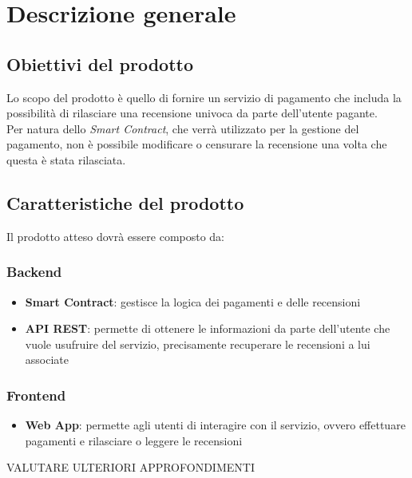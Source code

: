 \section{Descrizione generale}
    \subsection{Obiettivi del prodotto}
    Lo scopo del prodotto è quello di fornire un servizio di pagamento che includa la possibilità di rilasciare una recensione univoca da parte dell'utente pagante. \\
    Per natura dello \textit{Smart Contract}, che verrà utilizzato per la gestione del pagamento, non è possibile modificare o censurare la recensione una volta che questa è stata rilasciata. 

    \subsection{Caratteristiche del prodotto}
    Il prodotto atteso dovrà essere composto da:

        \subsubsection{Backend}
        \begin{itemize}
            \item \textbf{Smart Contract}: gestisce la logica dei pagamenti e delle recensioni
            \item \textbf{API REST}: permette di ottenere le informazioni da parte dell'utente che vuole usufruire del servizio, precisamente recuperare le recensioni a lui associate 
        \end{itemize}

        \subsubsection{Frontend}
        \begin{itemize}
            \item \textbf{Web App}: permette agli utenti di interagire con il servizio, ovvero effettuare pagamenti e rilasciare o leggere le recensioni
        \end{itemize}

        VALUTARE ULTERIORI APPROFONDIMENTI

